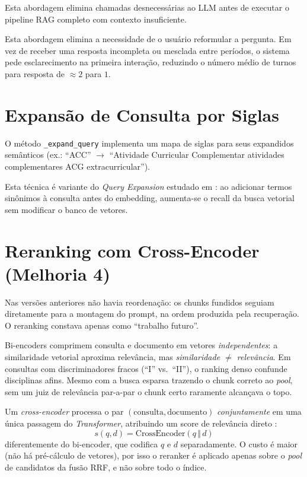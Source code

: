 \documentclass[12pt,a4paper]{report}
\begin{document}
Esta abordagem elimina chamadas desnecessárias ao LLM antes de
executar o pipeline RAG completo com contexto insuficiente.

\begin{insight}[title=Ganho esperado]
Esta abordagem elimina a necessidade de o usuário reformular a pergunta.
Em vez de receber uma resposta incompleta ou mesclada entre períodos,
o sistema pede esclarecimento na primeira interação, reduzindo o número
médio de turnos para resposta de $\approx 2$ para $1$.
\end{insight}

\section{Expansão de Consulta por Siglas}

O método \texttt{\_expand\_query} implementa um mapa de siglas para seus
expandidos semânticos (ex.: ``ACC'' $\to$ ``Atividade Curricular
Complementar atividades complementares ACG extracurricular'').

Esta técnica é variante do \textit{Query Expansion} estudado em
\textcite{carpineto2012survey}: ao adicionar termos sinônimos à consulta
antes do embedding, aumenta-se o recall da busca vetorial sem modificar
o banco de vetores.

\section{Reranking com Cross-Encoder (Melhoria 4)}
\label{sec:reranking}

\begin{historico}
Nas versões anteriores não havia reordenação: os chunks fundidos seguiam
diretamente para a montagem do prompt, na ordem produzida pela recuperação.
O reranking constava apenas como ``trabalho futuro''.
\end{historico}

\begin{problema}
Bi-encoders comprimem consulta e documento em vetores \emph{independentes}:
a similaridade vetorial aproxima relevância, mas \emph{similaridade $\neq$
relevância}. Em consultas com discriminadores fracos (``I'' vs.\ ``II''), o
ranking denso confunde disciplinas afins. Mesmo com a busca esparsa trazendo o
chunk correto ao \textit{pool}, sem um juiz de relevância par-a-par o chunk
certo raramente alcançava o topo.
\end{problema}

Um \textit{cross-encoder} processa o par
$(\text{consulta},\text{documento})$ \emph{conjuntamente} em uma única passagem
do \textit{Transformer}, atribuindo um score de relevância direto
\autocite{khattab2020colbert}:
\begin{equation}
  s(q,d) = \text{CrossEncoder}(q \,\Vert\, d)
\end{equation}
diferentemente do bi-encoder, que codifica $q$ e $d$ separadamente. O custo é
maior (não há pré-cálculo de vetores), por isso o reranker é aplicado apenas
sobre o \textit{pool} de candidatos da fusão RRF, e não sobre todo o índice.
\end{document}
